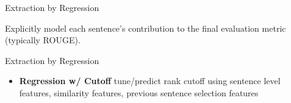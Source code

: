 \documentclass[xcolor={table}]{beamer}
\begin{document}
\begin{frame}{
    }
\begin{figure}[!h]
 \end{figure}
\end{frame}

\begin{frame}{Extraction by Regression}

    Explicitly model each sentence's contribution to the final evaluation
        metric (typically ROUGE).

\end{frame}

\begin{frame}{Extraction by Regression}
    \begin{itemize}
 \item \textbf{Regression w/ Cutoff} tune/predict rank cutoff using 
        sentence level features, similarity features, previous sentence 
        selection features
        {\tiny \cite{guo2013updating,mccreadie2014incremental}  }
    \end{itemize}
\end{frame}
\end{document}
